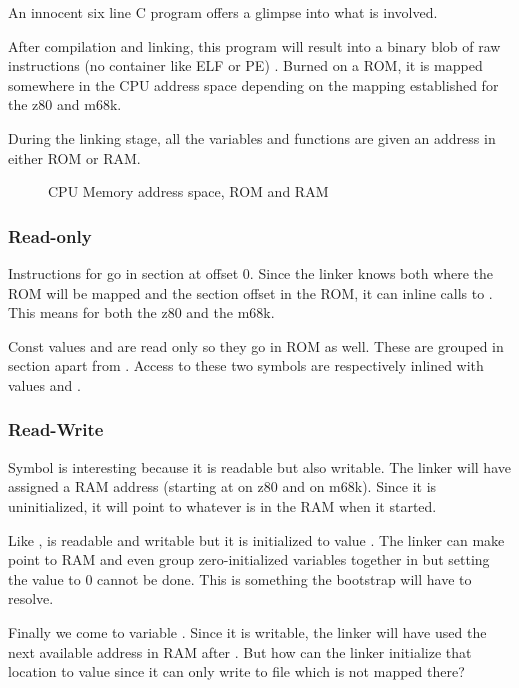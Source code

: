 An innocent six line C program offers a glimpse into what is involved.



After compilation and linking, this program will result into a binary blob of raw instructions (no container like ELF or PE) . Burned on a ROM, it is mapped somewhere in the CPU address space depending on the mapping established for the z80 and m68k.

During the linking stage, all the variables and functions are given an address in either ROM or RAM. 

\begin{figure}[H]
\caption*{CPU Memory address space, ROM and RAM}
\end{figure}

\subsubsection{Read-only}
Instructions for  go in section  at offset 0. Since the linker knows both where the ROM will be mapped and the section offset in the ROM, it can inline calls to . This means  for both the z80 and the m68k.

Const values  and  are read only so they go in ROM as well. These are grouped in section  apart from . Access to these two symbols are respectively inlined with values  and .



\subsubsection{Read-Write}
Symbol  is interesting because it is readable but also writable. The linker will have assigned a RAM address (starting at  on z80 and  on m68k). Since it is uninitialized, it will point to whatever is in the RAM when it started.

Like ,  is readable and writable but it is initialized to value . The linker can make  point to RAM and even group zero-initialized variables together in  but setting the value to 0 cannot be done. This is something the bootstrap will have to resolve.

Finally we come to variable . Since it is writable, the linker will have used the next available address in RAM after . But how can the linker initialize that location to value  since it can only write to file  which is not mapped there? 

